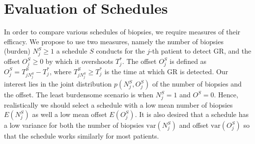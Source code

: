 \section{Evaluation of Schedules}
\label{c2:sec:choosing_schedule}
In order to compare various schedules of biopsies, we require measures of their efficacy. We propose to use two measures, namely the number of biopsies (burden) $N^S_j \geq 1$ a schedule $S$ conducts for the $j$-th patient to detect GR, and the offset $O^S_j \geq 0$ by which it overshoots $T^*_j$. The offset $O^S_j$ is defined as $O^S_j = T^S_{j{N^S_j}} - T^*_j$, where $T^S_{j{N^S_j}} \geq T^*_j$ is the time at which GR is detected. Our interest lies in the joint distribution $p(N^S_j, O^S_j)$ of the number of biopsies and the offset. The least burdensome scenario is when $N^S_j=1$ and $O^S=0$. Hence, realistically we should select a schedule with a low mean number of biopsies $E(N^S_j)$ as well a low mean offset $E(O^S_j)$. It is also desired that a schedule has a low variance for both the number of biopsies $\mbox{var}(N^S_j)$ and offset $\mbox{var}(O^S_j)$ so that the schedule works similarly for most patients. 


